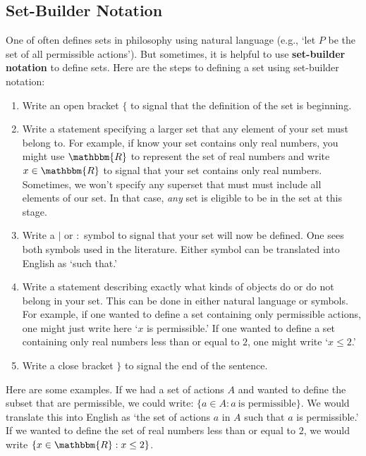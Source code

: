 \documentclass[11pt]{article}
\theoremstyle{definition}
\theoremstyle{remark}
\begin{document}
\subsection{Set-Builder Notation}
One of often defines sets in philosophy using natural language (e.g., `let $P$ be the set of all permissible actions'). But sometimes, it is helpful to use \textbf{set-builder notation} to define sets. Here are the steps to defining a set using set-builder notation:
\begin{enumerate}
    \item Write an open bracket $\{$ to signal that the definition of the set is beginning.

    \item Write a statement specifying a larger set that any element of your set must belong to. For example, if know your set contains only real numbers, you might use $\mathbbm{R}$ to represent the set of real numbers and write $x\in\mathbbm{R}$ to signal that your set contains only real numbers. Sometimes, we won't specify any superset that must must include all elements of our set. In that case, \textit{any} set is eligible to be in the set at this stage.

    \item Write a $|$ or $:$ symbol to signal that your set will now be defined. One sees both symbols used in the literature. Either symbol can be translated into English as `such that.' 

    \item Write a statement describing exactly what kinds of objects do or do not belong in your set. This can be done in either natural language or symbols. For example, if one wanted to define a set containing only permissible actions, one might just write here `$x$ is permissible.' If one wanted to define a set containing only real numbers less than or equal to $2$, one might write `$x\leq 2$.'

    \item Write a close bracket $\}$ to signal the end of the sentence.
\end{enumerate}
Here are some examples. If we had a set of actions $A$ and wanted to define the subset that are permissible, we could write:
$\{a\in A : a \ \text{is permissible}\}.$
We would translate this into English as `the set of actions $a$ in $A$ such that $a$ is permissible.' If we wanted to define the set of real numbers less than or equal to $2$, we would write $\{x\in\mathbbm{R}:x\leq 2\}$.\par 
\end{document}
